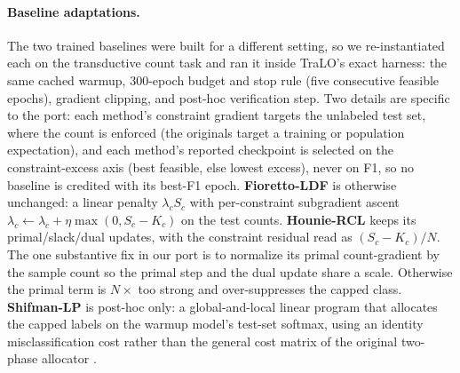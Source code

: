 \documentclass[letterpaper]{article} %
\begin{document}
\paragraph{Baseline adaptations.}
The two trained baselines were built for a different setting, so we re-instantiated each
on the transductive count task and ran it inside TraLO's exact harness: the same cached
warmup, $300$-epoch budget and stop rule (five consecutive feasible epochs), gradient
clipping, and post-hoc verification step. Two details are specific to the port: each
method's constraint gradient targets the unlabeled test set, where the count is enforced
(the originals target a training or population expectation), and each method's reported
checkpoint is selected on the constraint-excess axis (best feasible, else lowest
excess), never on F1, so no baseline is credited with its best-F1 epoch. \textbf{Fioretto-LDF} is otherwise unchanged: a linear
penalty $\lambda_c S_c$ with per-constraint subgradient ascent
$\lambda_c\!\leftarrow\!\lambda_c+\eta\max(0,S_c\!-\!K_c)$ on the test counts.
\textbf{Hounie-RCL} keeps its primal/slack/dual updates, with the constraint residual read
as $(S_c\!-\!K_c)/N$. The one substantive fix in our port is to normalize its primal
count-gradient by the sample count so the primal step and the dual update share a
scale. Otherwise the primal term is $N\times$ too strong and over-suppresses the capped
class. \textbf{Shifman-LP} is post-hoc only: a global-and-local linear program that allocates the
capped labels on the warmup model's test-set softmax, using an identity misclassification
cost rather than the general cost matrix of the original two-phase allocator \citep{shifman2025classification}.
\end{document}
